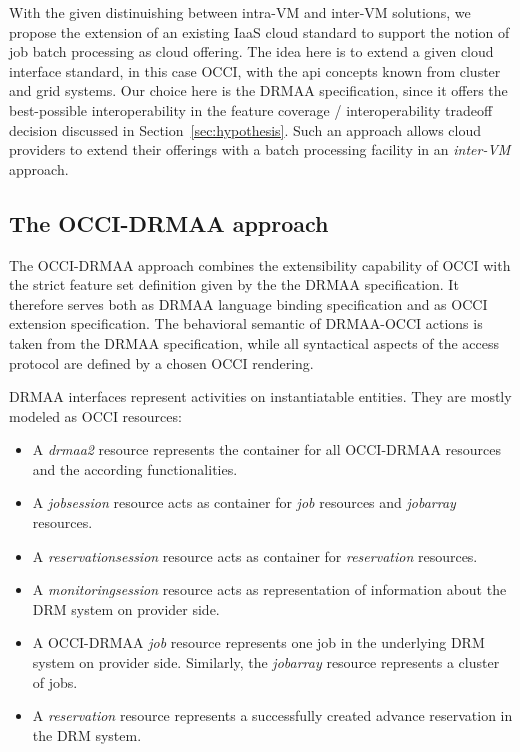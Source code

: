 \documentclass[twocolumn]{svjour3}       %
\begin{document}
With the given distinuishing between intra-VM and inter-VM solutions, we propose the extension of an existing IaaS cloud standard to support the notion of job batch processing as cloud offering. The idea here is to extend a given cloud interface standard, in this case OCCI, with the \gls{api} concepts known from cluster and grid systems. Our choice here is the DRMAA specification, since it offers the best-possible interoperability in the feature coverage / interoperability tradeoff decision discussed in Section~\ref{sec:hypothesis}. Such an approach allows cloud providers to extend their offerings with a batch processing facility in an \emph{inter-VM} approach.

\subsection{The OCCI-DRMAA approach}
\label{sec:occidrmaa}

The OCCI-DRMAA approach combines the extensibility capability of OCCI with the strict feature set definition given by the the DRMAA specification. It therefore serves both as DRMAA language binding specification and as OCCI extension specification. The behavioral semantic of DRMAA-OCCI actions is taken from the DRMAA specification, while all syntactical aspects of the access protocol are defined by a chosen OCCI rendering.

DRMAA interfaces represent activities on instantiatable entities. They are mostly modeled as OCCI resources:

\begin{itemize}
\item A \emph{drmaa2} resource represents the container for all OCCI-DRMAA resources and the according functionalities. 
\item A \emph{jobsession} resource acts as container for \emph{job} resources and \emph{jobarray} resources. 
\item A \emph{reservationsession} resource acts as container for \emph{reservation} resources. 
\item A \emph{monitoringsession} resource acts as representation of information about the DRM system on provider side. 
\item A OCCI-DRMAA \emph{job} resource represents one job in the underlying DRM system on provider side. Similarly, the \emph{jobarray} resource represents a cluster of jobs.
\item A \emph{reservation} resource represents a successfully created advance reservation in the DRM system.
\end{itemize}
\end{document}
